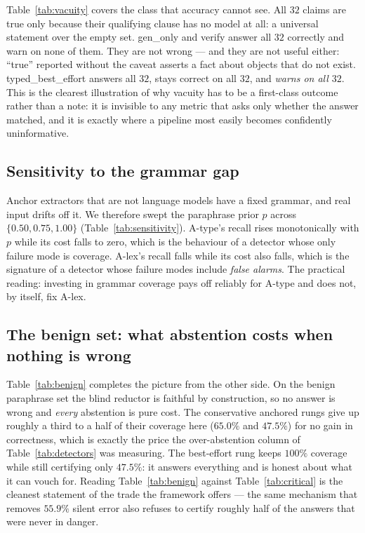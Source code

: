 \documentclass[11pt]{article}
\newcommand{\pGen}{\textsf{gen\_only}}
\newcommand{\pVerify}{\textsf{verify}}
\newcommand{\pTypBest}{\textsf{typed\_best\_effort}}
\newcommand{\Alex}{\textsf{A-lex}}
\newcommand{\Atype}{\textsf{A-type}}
\theoremstyle{definition}
\begin{document}


Table~\ref{tab:vacuity} covers the class that accuracy cannot see. All $32$
claims are true only because their qualifying clause has no model at all: a
universal statement over the empty set. \pGen{} and \pVerify{} answer all $32$
correctly and warn on none of them. They are not wrong --- and they are not
useful either: ``true'' reported without the caveat asserts a fact about objects
that do not exist. \pTypBest{} answers all $32$, stays correct on all $32$, and
\emph{warns on all $32$}. This is the clearest illustration of why vacuity has to
be a first-class outcome rather than a note: it is invisible to any metric that
asks only whether the answer matched, and it is exactly where a pipeline most
easily becomes confidently uninformative.

\subsection{Sensitivity to the grammar gap}
\label{sec:sensitivity}



Anchor extractors that are not language models have a fixed grammar, and real
input drifts off it. We therefore swept the paraphrase prior $p$ across
$\{0.50, 0.75, 1.00\}$ (Table~\ref{tab:sensitivity}). \Atype's recall rises
monotonically with $p$ while its cost falls to zero, which is the behaviour of a
detector whose only failure mode is coverage. \Alex's recall falls while its cost
also falls, which is the signature of a detector whose failure modes include
\emph{false alarms}. The practical reading: investing in grammar coverage pays
off reliably for \Atype{} and does not, by itself, fix \Alex.

\subsection{The benign set: what abstention costs when nothing is wrong}
\label{sec:benign}



Table~\ref{tab:benign} completes the picture from the other side. On the benign
paraphrase set the blind reductor is faithful by construction, so no answer is
wrong and \emph{every} abstention is pure cost. The conservative anchored rungs
give up roughly a third to a half of their coverage here
($65.0\%$ and $47.5\%$) for no gain in correctness, which is exactly the price
the over-abstention column of Table~\ref{tab:detectors} was measuring. The
best-effort rung keeps $100\%$ coverage while still certifying only $47.5\%$:
it answers everything and is honest about what it can vouch for. Reading
Table~\ref{tab:benign} against Table~\ref{tab:critical} is the cleanest statement
of the trade the framework offers --- the same mechanism that removes
$55.9\%$ silent error also refuses to certify roughly half of the answers that
were never in danger.
\end{document}
